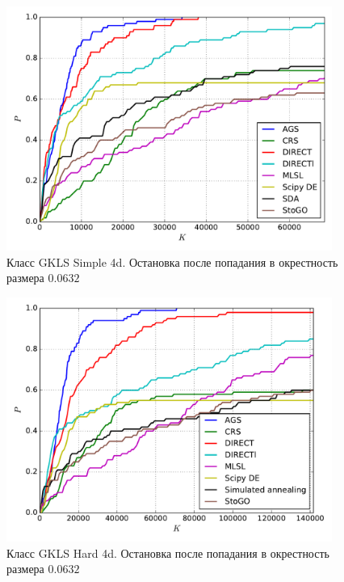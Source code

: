 \documentclass[a4paper]{article}
\begin{document}
\begin{figure}[H]
  \center
  \includegraphics[width=0.95\textwidth]{../experiments_serg_scheme/gklss4d/cmc.pdf}
  \caption{Класс GKLS Simple 4d. Остановка после попадания в окрестность размера $0.0632$}
  \label{fig:}
\end{figure}


\begin{figure}[H]
  \center
  \includegraphics[width=0.95\textwidth]{../experiments_serg_scheme/gklsh4d/cmc.pdf}
  \caption{Класс GKLS Hard 4d. Остановка после попадания в окрестность размера $0.0632$}
  \label{fig:}
\end{figure}

\end{document}
